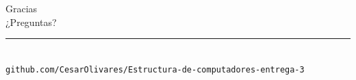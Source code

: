 \documentclass[aspectratio=169,10pt]{beamer}
\begin{document}
\begin{frame}[plain]
\vfill
\begin{center}
{\dinfont\fontsize{40}{46}\selectfont\color{marino}Gracias}\\[14pt]
{\Large\color{grisazul}¿Preguntas?}\\[24pt]
{\color{tealu}\rule{2.2cm}{2pt}}\\[14pt]
{\small\color{grisazul}\texttt{github.com/CesarOlivares/Estructura-de-computadores-entrega-3}}
\end{center}
\vfill
\end{frame}
\end{document}
